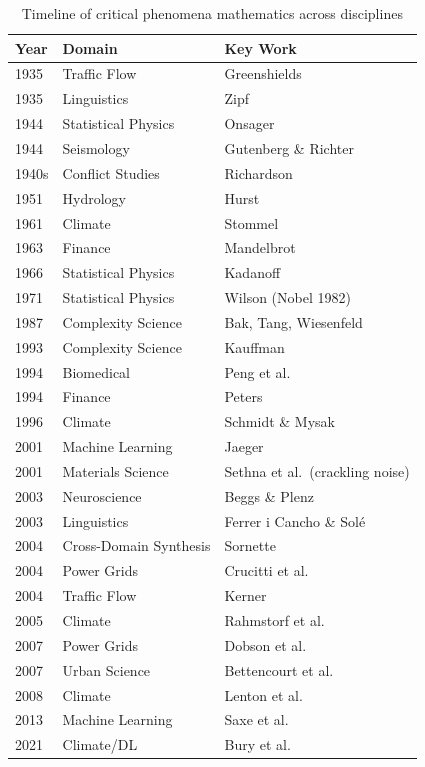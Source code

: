\documentclass[11pt]{article}
\begin{document}
\begin{table}[ht]
\centering
\caption{Timeline of critical phenomena mathematics across disciplines}
\label{tab:timeline}
\begin{tabular}{lll}
\toprule
\textbf{Year} & \textbf{Domain} & \textbf{Key Work} \\
\midrule
1935 & Traffic Flow & Greenshields \\
1935 & Linguistics & Zipf \\
1944 & Statistical Physics & Onsager \\
1944 & Seismology & Gutenberg \& Richter \\
1940s & Conflict Studies & Richardson \\
1951 & Hydrology & Hurst \\
1961 & Climate & Stommel \\
1963 & Finance & Mandelbrot \\
1966 & Statistical Physics & Kadanoff \\
1971 & Statistical Physics & Wilson (Nobel 1982) \\
1987 & Complexity Science & Bak, Tang, Wiesenfeld \\
1993 & Complexity Science & Kauffman \\
1994 & Biomedical & Peng et al. \\
1994 & Finance & Peters \\
1996 & Climate & Schmidt \& Mysak \\
2001 & Machine Learning & Jaeger \\
2001 & Materials Science & Sethna et al.\ (crackling noise) \\
2003 & Neuroscience & Beggs \& Plenz \\
2003 & Linguistics & Ferrer i Cancho \& Sol\'e \\
2004 & Cross-Domain Synthesis & Sornette \\
2004 & Power Grids & Crucitti et al. \\
2004 & Traffic Flow & Kerner \\
2005 & Climate & Rahmstorf et al. \\
2007 & Power Grids & Dobson et al. \\
2007 & Urban Science & Bettencourt et al. \\
2008 & Climate & Lenton et al. \\
2013 & Machine Learning & Saxe et al. \\
2021 & Climate/DL & Bury et al. \\
\bottomrule
\end{tabular}
\end{table}
\end{document}
